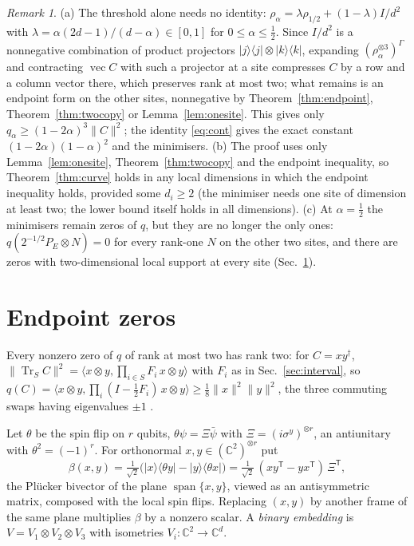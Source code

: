 \documentclass[aps,pra,twocolumn,superscriptaddress,nofootinbib,longbibliography]{revtex4-2}
\newcommand{\C}{\mathbb C}
\newcommand{\ket}[1]{|#1\rangle}
\newcommand{\bra}[1]{\langle #1|}
\DeclareMathOperator{\Tr}{Tr}
\DeclareMathOperator{\spn}{span}
\DeclareMathOperator{\vecop}{vec}
\newcommand{\T}{\mathsf T}
\theoremstyle{plain}
\theoremstyle{definition}
\theoremstyle{remark}
\newtheorem{remark}[theorem]{Remark}
\begin{document}
\begin{remark}\label{rem:interval}
(a) The threshold alone needs no identity: $\rho_\alpha=\lambda\rho_{1/2}+(1-\lambda)I/d^2$ with $\lambda=\alpha(2d-1)/(d-\alpha)\in[0,1]$ for $0\le\alpha\le\tfrac12$. Since $I/d^2$ is a nonnegative combination of product projectors $\ket j\bra j\otimes\ket k\bra k$, expanding $(\rho_\alpha^{\otimes3})^\Gamma$ and contracting $\vecop C$ with such a projector at a site compresses $C$ by a row and a column vector there, which preserves rank at most two; what remains is an endpoint form on the other sites, nonnegative by Theorem~\ref{thm:endpoint}, Theorem~\ref{thm:twocopy} or Lemma~\ref{lem:onesite}. This gives only $q_\alpha\ge(1-2\alpha)^3\|C\|^2$; the identity \eqref{eq:cont} gives the exact constant $(1-2\alpha)(1-\alpha)^2$ and the minimisers.
(b) The proof uses only Lemma~\ref{lem:onesite}, Theorem~\ref{thm:twocopy} and the endpoint inequality, so Theorem~\ref{thm:curve} holds in any local dimensions in which the endpoint inequality holds, provided some $d_i\ge2$ (the minimiser needs one site of dimension at least two; the lower bound itself holds in all dimensions).
(c) At $\alpha=\tfrac12$ the minimisers remain zeros of $q$, but they are no longer the only ones: $q(2^{-1/2}P_E\otimes N)=0$ for every rank-one $N$ on the other two sites, and there are zeros with two-dimensional local support at every site (Sec.~\ref{sec:zeros}).
\end{remark}

\section{Endpoint zeros}\label{sec:zeros}

Every nonzero zero of $q$ of rank at most two has rank two: for $C=xy^\dagger$, $\|\Tr_SC\|^2=\langle x\otimes y,\prod_{i\in S}F_i\,x\otimes y\rangle$ with $F_i$ as in Sec.~\ref{sec:interval}, so $q(C)=\langle x\otimes y,\prod_i(I-\tfrac12F_i)\,x\otimes y\rangle\ge\tfrac18\|x\|^2\|y\|^2$, the three commuting swaps having eigenvalues $\pm1$ \cite{CostaRico}.

Let $\theta$ be the spin flip on $r$ qubits, $\theta\psi=\Xi\bar\psi$ with $\Xi=(i\sigma^y)^{\otimes r}$, an antiunitary with $\theta^2=(-1)^r$. For orthonormal $x,y\in(\C^2)^{\otimes r}$ put
\begin{equation}\label{eq:beta}
\beta(x,y)=\tfrac1{\sqrt2}\bigl(\ket x\bra{\theta y}-\ket y\bra{\theta x}\bigr)=\tfrac1{\sqrt2}\,(xy^{\T}-yx^{\T})\,\Xi^{\T},
\end{equation}
the Pl\"ucker bivector of the plane $\spn\{x,y\}$, viewed as an antisymmetric matrix, composed with the local spin flips. Replacing $(x,y)$ by another frame of the same plane multiplies $\beta$ by a nonzero scalar. A \emph{binary embedding} is $V=V_1\otimes V_2\otimes V_3$ with isometries $V_i:\C^2\to\C^{d}$.
\end{document}
